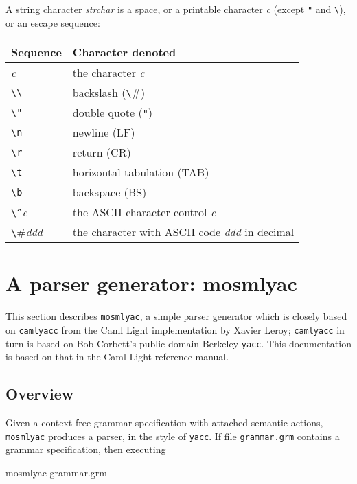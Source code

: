 \documentclass[fleqn,a4paper]{article}
\begin{document}
\noindent A string character {\it strchar\/} is a space, or a
printable character {\it c\/} (except {\tt "} and \verb#\#), or an
escape sequence:

\begin{quot}
\begin{tabular}{@{}|l|l|}\hline
Sequence & Character denoted \\\hline
{\it c\/}       & the character {\it c\/}\\
\verb#\\#       & backslash (\verb#\#)\\
\verb#\"#       & double quote (\verb#"#)\\
\verb#\n#       & newline (LF)\\
\verb#\r#       & return (CR)\\
\verb#\t#       & horizontal tabulation (TAB)\\
\verb#\b#       & backspace (BS)\\
\verb#\^#{\it c\/}      & the ASCII character control-{\it c\/}\\
\verb#\#{\it ddd\/}     & the character with ASCII code {\it ddd\/} in
decimal\\\hline 
\end{tabular}
\end{quot}

\newpage

\section{A parser generator: mosmlyac}
\label{sec-mosmlyac}

This section describes {\tt mosmlyac}, a simple parser generator which
is closely based on {\tt camlyacc} from the Caml Light implementation
by Xavier Leroy; {\tt camlyacc} in turn is based on Bob Corbett's
public domain Berkeley {\tt yacc}.  This documentation is based on
that in the Caml Light reference manual.


\subsection{Overview}

Given a context-free grammar specification with attached semantic
actions, {\tt mosmlyac} produces a parser, in the style of {\tt yacc}.
If file {\tt grammar.grm} contains a grammar specification, then
executing

\begin{program}
mosmlyac grammar.grm  
\end{program}
\end{document}
